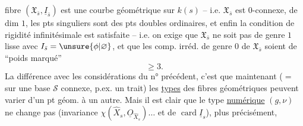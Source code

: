 fibre $(\mathfrak X_{\bar s},\underline I_{\bar s})$ est une courbe géométrique sur $k(s)$ -- i.e. $\mathfrak X_{\bar s}$ est $0$-connexe, de dim $1$,  les pts singuliers sont  des pts doubles ordinaires, et enfin la condition de rigidité infinitésimale  est satisfaite --  i.e. on exige que $\mathfrak X_{\bar s}$ ne soit pas de genre $1$ lisse avec $I_{\bar s}=\unsure{\phi|\varnothing}$, et que les comp. irréd. de genre $0$ de $\mathfrak X_{\bar s}$ soient de ``poids marqué''
\[
\geqslant 3.
\]
La différence avec les considérations du n° précédent, c'est que maintenant ($=$ sur une base $\mathcal S$ connexe, p.ex.  un trait) les \uline{types} des fibres géométriques peuvent varier d'un pt géom. à un autre. Mais il est clair que le type \uline{numérique} $(g,\nu)$ ne change pas (invariance  $\chi(\widehat X_s,\underline O_{\widehat X_s})\ldots$ et de $\operatorname{card}\underline I_s$), plus précisément,
